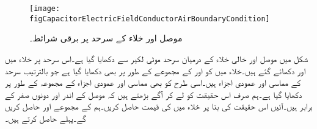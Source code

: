 \begin{figure}
\centering
\texttt{[image: figCapacitorElectricFieldConductorAirBoundaryCondition]}
\caption{موصل اور خلاء کے سرحد پر برقی شرائط۔}
\label{شکل_کپیسٹر_موصل_خلاء_برقی_شرائط}
\end{figure}

شکل  میں موصل اور خالی خلاء کے درمیان سرحد موٹی لکیر سے دکھایا گیا ہے۔اس سرحد پر خلاء میں  اور  دکھائے گئے ہیں۔خلاء میں  کو  اور  کے مجموعے کے طور پر بھی دکھایا گیا ہے جو بالترتیب سرحد کے مماسی اور عمودی اجزاء ہیں۔اسی طرح  کو بھی مماسی اور عمودی اجزاء کے مجموعہ کے طور پر دکھایا گیا ہے۔ہم صرف اس حقیقت کو لے کر آگے بڑھتے ہیں کہ موصل کے اندر  اور  دونوں صفر کے برابر ہیں۔آئیں اس حقیقت کی بنا پر خلاء میں    کی قیمت حاصل کریں۔ہم  کے مجموعے   اور  حاصل کریں گے۔پہلے  حاصل کرتے ہیں۔ 

